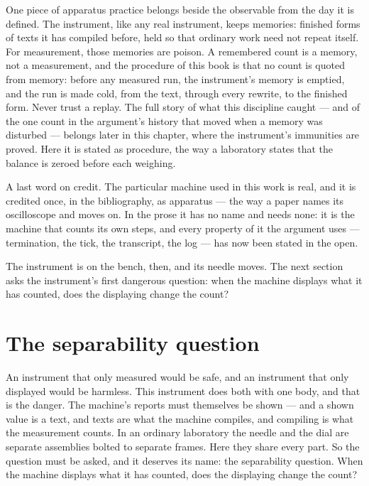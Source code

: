 One piece of apparatus practice belongs beside the observable from the day it is
defined. The instrument, like any real instrument, keeps memories: finished forms of
texts it has compiled before, held so that ordinary work need not repeat itself. For
measurement, those memories are poison. A remembered count is a memory, not a
measurement, and the procedure of this book is that no count is quoted from memory:
before any measured run, the instrument's memory is emptied, and the run is made cold,
from the text, through every rewrite, to the finished form. Never trust a replay. The
full story of what this discipline caught --- and of the one count in the argument's
history that moved when a memory was disturbed --- belongs later in this chapter, where
the instrument's immunities are proved. Here it is stated as procedure, the way a
laboratory states that the balance is zeroed before each weighing.

A last word on credit. The particular machine used in this work is real, and it is
credited once, in the bibliography, as apparatus --- the way a paper names its
oscilloscope and moves on. In the prose it has no name and needs none: it is the
machine that counts its own steps, and every property of it the argument uses ---
termination, the tick, the transcript, the log --- has now been stated in the open.

The instrument is on the bench, then, and its needle moves. The next section asks the
instrument's first dangerous question: when the machine displays what it has counted,
does the displaying change the count?

\section{The separability question}

An instrument that only measured would be safe, and an instrument that only displayed
would be harmless. This instrument does both with one body, and that is the danger. The
machine's reports must themselves be shown --- and a shown value is a text, and texts
are what the machine compiles, and compiling is what the measurement counts. In an
ordinary laboratory the needle and the dial are separate assemblies bolted to separate
frames. Here they share every part. So the question must be asked, and it deserves its
name: the separability question. When the machine displays what it has counted, does
the displaying change the count?


